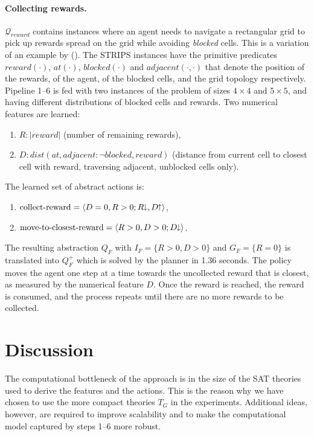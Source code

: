 \documentclass[letterpaper]{article} %
\newcommand{\tup}[1]{\langle #1 \rangle}
\newcommand{\abs}[1]{\ensuremath{\left\vert{#1}\right\vert}}
\newcommand{\citeay}[1]{\citeauthor{#1} (\citeyear{#1})}
\newcommand{\Q}{\mathcal{Q}}
\newcommand{\abst}[2]{\tup{#1;#2}}
\newcommand{\pplus}{\hspace{-.05em}\raisebox{.15ex}{\footnotesize$\uparrow$}}
\newcommand{\mminus}{\hspace{-.05em}\raisebox{.15ex}{\footnotesize$\downarrow$}}
\begin{document}
\paragraph{Collecting rewards.}
$\Q_{reward}$ contains instances where  an agent needs to navigate a rectangular
grid to pick up  rewards spread on the grid  while
avoiding \emph{blocked} cells. This is a variation of an
example  by \citeay{garnelo2016towards}.
The STRIPS instances have the primitive predicates $reward(\cdot)$, $at(\cdot)$, $blocked(\cdot)$
and $adjacent(\cdot,\cdot)$ that denote the position of the rewards, of
the agent, of the blocked cells, and the grid topology respectively.
Pipeline 1--6  is fed with two instances of the problem of sizes $4 \times 4$
and $5\times 5$, and having different distributions of blocked cells and rewards.
Two numerical features are learned:
\begin{enumerate}[--]
  \item $R: \abs{reward}$ (number of remaining rewards),
  \item $D:\! dist(at, adjacent{:}\neg blocked, reward)$ (distance from current
    cell to closest cell with reward, traversing adjacent, unblocked cells only).
\end{enumerate}
The learned set of abstract actions is:
\begin{enumerate}[--]
  \item $\text{collect-reward} = \abst{D=0, R > 0}{R\mminus, D\pplus}$,
  \item $\text{move-to-closest-reward} = \abst{R>0, D>0}{D\mminus}$.
\end{enumerate}

The resulting  abstraction $Q_F$ with $I_F = \{ R>0, D>0 \}$ and $G_F=\{R=0\}$
is translated into $Q^+_F$ which is solved by the planner in 1.36 seconds.
The policy moves the agent one step at a time towards the uncollected reward
that is closest, as measured by the numerical feature $D$. Once the reward is
reached, the reward is consumed, and the process repeats until there are no
more rewards to be collected.


\section{Discussion}

The computational  bottleneck of the approach
is  in the size of the SAT  theories used to derive the features
and the actions.
This is the   reason why we have chosen to use the more compact theories $T_G$
in the experiments.  Additional ideas, however, are required
to improve scalability and to make the computational model
captured by  steps 1--6 more robust.
\end{document}
